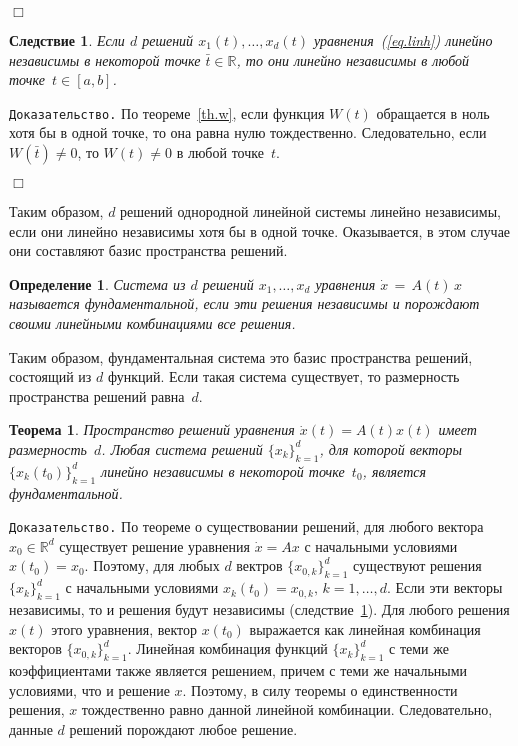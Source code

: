 \documentclass[12pt,a4paper]{article}
\newtheorem{theorem}{Теорема}
\newtheorem{cor}{Следствие}
\newtheorem{defi}{Определение}
\newcommand{\re}{{\mathbb R}}
\begin{document}
   {\hfill $\Box$}
\medskip

\begin{cor}\label{c.indep}
Если $d$ решений $x_1(t), \ldots , x_d(t)$ уравнения~(\ref{eq.linh}) линейно независимы в некоторой точке $\bar t \in \re$,
то они линейно независимы в любой точке~$t \in [a, b]$.
\end{cor}
{\tt Доказательство.} По теореме~\ref{th.w}, если функция $W(t)$ обращается в ноль хотя бы в одной точке,
то она равна нулю тождественно. Следовательно, если $W(\bar t) \ne 0$, то $W(t)\ne 0$ в любой точке~$t$.

   {\hfill $\Box$}
\medskip

Таким образом, $d$ решений однородной линейной системы линейно независимы, если они линейно независимы
хотя бы в одной точке. Оказывается, в этом случае они составляют базис пространства решений.
\begin{defi}\label{d.lin-f}
Система из  $d$ решений $x_1, \ldots, x_d$ уравнения $\dot x \, = \, A(t) \, x$
называется фундаментальной, если эти решения независимы и порождают своими линейными комбинациями все решения.
\end{defi}
Таким образом, фундаментальная система это базис пространства решений, состоящий  из $d$ функций.  Если такая система существует, 
то размерность пространства решений равна~$d$.
\begin{theorem}\label{th.lin-f}
Пространство решений уравнения $\dot x(t) = A(t)x(t)$ имеет размерность~$d$.
Любая система решений $\{x_k\}_{k=1}^d$, для которой векторы $\{x_k(t_0)\}_{k=1}^d$
линейно независимы в некоторой точке~$t_0$, является фундаментальной.
\end{theorem}
{\tt Доказательство.} По теореме о существовании решений, для любого вектора
$x_0\in \re^d$  существует решение уравнения $\dot x = Ax$ с начальными условиями
$x(t_0) = x_0$. Поэтому, для любых  $d$ вектров $\{x_{0, k}\}_{k=1}^d$
существуют решения $\{x_{k}\}_{k=1}^d$ с начальными условиями $x_k(t_0) = x_{0, k}, \, k = 1, \ldots , d$.
Если эти векторы независимы, то и решения будут независимы (следствие~\ref{c.indep}).
Для любого решения $x(t)$ этого уравнения, вектор $x(t_0)$ выражается
как линейная комбинация векторов $\{x_{0, k}\}_{k=1}^d$. Линейная комбинация функций
 $\{x_k\}_{k=1}^d$ с теми же коэффициентами также является решением, причем с теми же начальными условиями,
   что и решение $x$. Поэтому, в силу теоремы о единственности решения, $x$ тождественно равно данной линейной
   комбинации. Следовательно, данные $d$ решений порождают любое решение.
\end{document}
